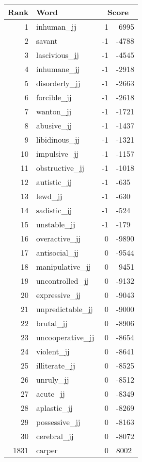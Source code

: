 \begin{longtable}[!htbp]{| rlr@{.}l |}
    \hline
    \textbf{Rank} & \textbf{Word} & \multicolumn{2}{c|}{\textbf{Score}} \\
    \hline
    \endhead
    1 & inhuman\_jj & -1 & -6995 \\
    2 & savant & -1 & -4788 \\
    3 & lascivious\_jj & -1 & -4545 \\
    4 & inhumane\_jj & -1 & -2918 \\
    5 & disorderly\_jj & -1 & -2663 \\
    6 & forcible\_jj & -1 & -2618 \\
    7 & wanton\_jj & -1 & -1721 \\
    8 & abusive\_jj & -1 & -1437 \\
    9 & libidinous\_jj & -1 & -1321 \\
    10 & impulsive\_jj & -1 & -1157 \\
    11 & obstructive\_jj & -1 & -1018 \\
    12 & autistic\_jj & -1 & -635 \\
    13 & lewd\_jj & -1 & -630 \\
    14 & sadistic\_jj & -1 & -524 \\
    15 & unstable\_jj & -1 & -179 \\
    16 & overactive\_jj & 0 & -9890 \\
    17 & antisocial\_jj & 0 & -9544 \\
    18 & manipulative\_jj & 0 & -9451 \\
    19 & uncontrolled\_jj & 0 & -9132 \\
    20 & expressive\_jj & 0 & -9043 \\
    21 & unpredictable\_jj & 0 & -9000 \\
    22 & brutal\_jj & 0 & -8906 \\
    23 & uncooperative\_jj & 0 & -8654 \\
    24 & violent\_jj & 0 & -8641 \\
    25 & illiterate\_jj & 0 & -8525 \\
    26 & unruly\_jj & 0 & -8512 \\
    27 & acute\_jj & 0 & -8349 \\
    28 & aplastic\_jj & 0 & -8269 \\
    29 & possessive\_jj & 0 & -8163 \\
    30 & cerebral\_jj & 0 & -8072 \\
    1831 & carper & 0 & 8002 \\

\end{longtable}
